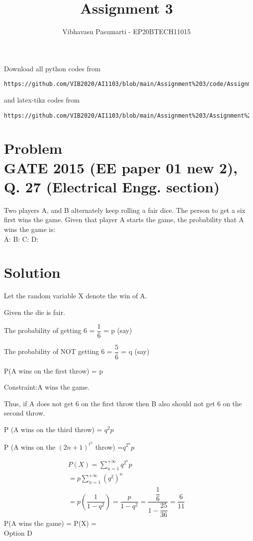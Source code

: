 \documentclass[journal,12pt,twocolumn]{IEEEtran}
\begin{document}
\title{Assignment 3}
\author{Vibhavasu Pasumarti - EP20BTECH11015}
\maketitle
\newpage
\bigskip
\renewcommand{\thefigure}{\theenumi}
\renewcommand{\thetable}{\theenumi}
Download all python codes from 
\begin{lstlisting}
https://github.com/VIB2020/AI1103/blob/main/Assignment%203/code/Assignment%203.py
\end{lstlisting}
%
and latex-tikz codes from 
%
\begin{lstlisting}
https://github.com/VIB2020/AI1103/blob/main/Assignment%203/Assignment%203.pdf
\end{lstlisting}
\section{\Large Problem\\ \large GATE 2015 (EE paper 01 new 2), Q. 27 (Electrical Engg. section)}

Two players A, and B alternately keep rolling a fair dice. The person to get a six first wins the game. Given that player A starts the game, the probability that A wins the game is:\\[5pt]
A: \hspace{1cm}
B: \hspace{1cm}
C: \hspace{1cm}
D: 
\section{\Large Solution}
\noindent
\begin{description}
    \item Let the random variable X denote the win of A.
    \item Given the die is fair.
    \item The probability of getting 6 = $\dfrac{1}{6}$ = p (say)
    \item The probability of NOT getting 6 = $\dfrac{5}{6}$ = q (say)
    \item P(A wins on the first throw) = p
    \item \large Constraint:\normalsize A wins the game.
    \item Thus, if A does not get 6 on the first throw then B also should not get 6 on the second throw.
    \item P (A wins on the third throw) = $q^2 p$
    \item \imples P (A wins on the $(2n + 1)^t^h $ throw) =\large $q^2^n p$
\end{description}
\begin{align}
    P(X) = \sum_{n=1}^{+\infty} q^2^n p \\[5pt]
    = p \sum_{n=1}^{+\infty} (q^2)^n    \\[5pt]
    = p \left(\dfrac{1}{1 - q^2}\right) = \dfrac{p}{1 - q^2}
    =\dfrac{\dfrac{1}{6}}{1 - \dfrac{25}{36}} = \dfrac{6}{11}
\end{align}
\centering
\Large P(A wins the game) = P(X) = \\[6pt]
Option D
\end{document}
